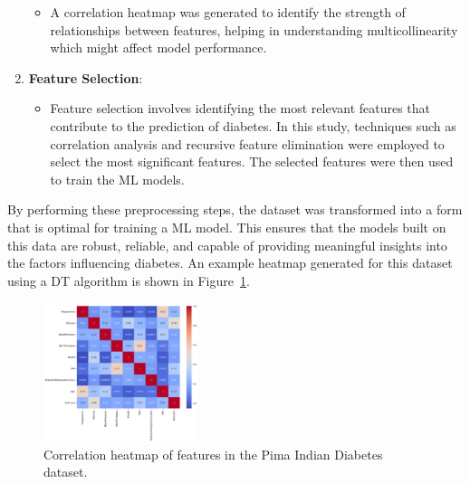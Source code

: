\begin{enumerate}
\begin{itemize}
        \item A correlation heatmap was generated to identify the strength of relationships between features, helping in understanding multicollinearity which might affect model performance.
    \end{itemize}
    \item \textbf{Feature Selection}:
    \begin{itemize}
        \item Feature selection involves identifying the most relevant features that contribute to the prediction of diabetes. In this study, techniques such as correlation analysis and recursive feature elimination were employed to select the most significant features. The selected features were then used to train the ML models.
    \end{itemize}
\end{enumerate}

By performing these preprocessing steps, the dataset was transformed into a form that is optimal for training a ML model. This ensures that the models built on this data are robust, reliable, and capable of providing meaningful insights into the factors influencing diabetes.
An example heatmap generated for this dataset using a DT algorithm is shown in Figure~\ref{fig:correlation_heatmap}.
\begin{figure}[htpb!]
    \centering
    \includegraphics[width=0.4\textwidth]{Images/heatmap.png}
    \caption{Correlation heatmap of features in the Pima Indian Diabetes dataset.}
    \label{fig:correlation_heatmap}
\end{figure}



